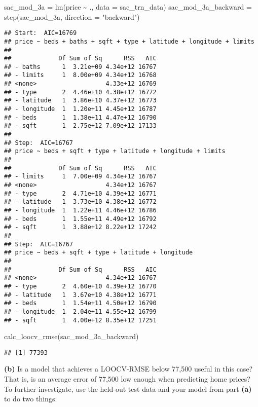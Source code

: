 \documentclass[
]{article}
\newenvironment{Shaded}{\begin{snugshade}}{\end{snugshade}}
\newcommand{\AttributeTok}[1]{\textcolor[rgb]{0.77,0.63,0.00}{#1}}
\newcommand{\FunctionTok}[1]{\textcolor[rgb]{0.00,0.00,0.00}{#1}}
\newcommand{\NormalTok}[1]{#1}
\newcommand{\OtherTok}[1]{\textcolor[rgb]{0.56,0.35,0.01}{#1}}
\newcommand{\SpecialCharTok}[1]{\textcolor[rgb]{0.00,0.00,0.00}{#1}}
\newcommand{\StringTok}[1]{\textcolor[rgb]{0.31,0.60,0.02}{#1}}
\begin{document}
\begin{Shaded}
\begin{Highlighting}[]
\NormalTok{sac\_mod\_3a }\OtherTok{=} \FunctionTok{lm}\NormalTok{(price }\SpecialCharTok{\textasciitilde{}}\NormalTok{ ., }\AttributeTok{data =}\NormalTok{ sac\_trn\_data)}
\NormalTok{sac\_mod\_3a\_backward }\OtherTok{=} \FunctionTok{step}\NormalTok{(sac\_mod\_3a, }\AttributeTok{direction =} \StringTok{"backward"}\NormalTok{)}
\end{Highlighting}
\end{Shaded}

\begin{verbatim}
## Start:  AIC=16769
## price ~ beds + baths + sqft + type + latitude + longitude + limits
## 
##             Df Sum of Sq      RSS   AIC
## - baths      1  3.21e+09 4.34e+12 16767
## - limits     1  8.00e+09 4.34e+12 16768
## <none>                   4.33e+12 16769
## - type       2  4.46e+10 4.38e+12 16772
## - latitude   1  3.86e+10 4.37e+12 16773
## - longitude  1  1.20e+11 4.45e+12 16787
## - beds       1  1.38e+11 4.47e+12 16790
## - sqft       1  2.75e+12 7.09e+12 17133
## 
## Step:  AIC=16767
## price ~ beds + sqft + type + latitude + longitude + limits
## 
##             Df Sum of Sq      RSS   AIC
## - limits     1  7.00e+09 4.34e+12 16767
## <none>                   4.34e+12 16767
## - type       2  4.71e+10 4.39e+12 16771
## - latitude   1  3.73e+10 4.38e+12 16772
## - longitude  1  1.22e+11 4.46e+12 16786
## - beds       1  1.55e+11 4.49e+12 16792
## - sqft       1  3.88e+12 8.22e+12 17242
## 
## Step:  AIC=16767
## price ~ beds + sqft + type + latitude + longitude
## 
##             Df Sum of Sq      RSS   AIC
## <none>                   4.34e+12 16767
## - type       2  4.60e+10 4.39e+12 16770
## - latitude   1  3.67e+10 4.38e+12 16771
## - beds       1  1.54e+11 4.50e+12 16790
## - longitude  1  2.04e+11 4.55e+12 16799
## - sqft       1  4.00e+12 8.35e+12 17251
\end{verbatim}

\begin{Shaded}
\begin{Highlighting}[]
\FunctionTok{calc\_loocv\_rmse}\NormalTok{(sac\_mod\_3a\_backward)}
\end{Highlighting}
\end{Shaded}

\begin{verbatim}
## [1] 77393
\end{verbatim}

\textbf{(b)} Is a model that achieves a LOOCV-RMSE below 77,500 useful
in this case? That is, is an average error of 77,500 low enough when
predicting home prices? To further investigate, use the held-out test
data and your model from part \textbf{(a)} to do two things:
\end{document}
